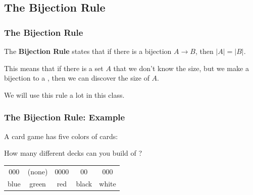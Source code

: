 \documentclass{beamer}
\begin{document}
\subsection{The Bijection Rule}

\begin{frame}
  \frametitle{The Bijection Rule}

  {\larger

    The {\bf Bijection Rule} states that if there is a bijection $A
    \to B$, then $|A| = |B|$.

    \bigskip

    This means that if there is a \alert{set $A$ that we don't know
      the size}, but we make a bijection to a , then we can discover the size of $A$.

    \bigskip

    We will use this rule a lot in this class.
  }
\end{frame}

\begin{frame}
  \frametitle{The Bijection Rule: Example}

  {\larger

    A card game has five colors of cards: 

    \bigskip
    
    How many different decks can you build of ?

    \vfill

    \begin{center}
      \begin{tabular}{ccccc}
        000 & (none) & 0000 & 00 & 000\\
        blue & green & red & black & white\\
      \end{tabular}
    \end{center}
  }  
\end{frame}
\end{document}
